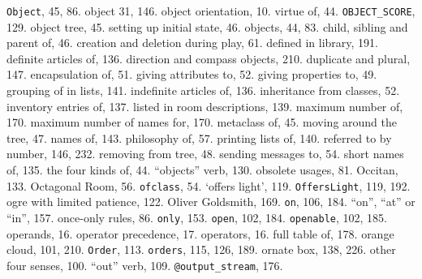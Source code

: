 {{\tt Object}}, 45, 86.
object 31, 146.
object orientation, 10.
\quad  virtue of, 44.
{{\tt OBJECT\_SCORE}}, 129.
object tree, 45.
\quad  setting up initial state, 46.
objects, 44, 83.
\quad  child, sibling and parent of, 46.
\quad  creation and deletion during play, 61.
\quad  defined in library, 191.
\quad  definite articles of, 136.
\quad  direction and compass objects, 210.
\quad  duplicate and plural, 147.
\quad  encapsulation of, 51.
\quad  giving attributes to, 52.
\quad  giving properties to, 49.
\quad  grouping of in lists, 141.
\quad  indefinite articles of, 136.
\quad  inheritance from classes, 52.
\quad  inventory entries of, 137.
\quad  listed in room descriptions, 139.
\quad  maximum number of, 170.
\quad  maximum number of names for, 170.
\quad  metaclass of, 45.
\quad  moving around the tree, 47.
\quad  names of, 143.
\quad  philosophy of, 57.
\quad  printing lists of, 140.
\quad  referred to by number, 146, 232.
\quad  removing from tree, 48.
\quad  sending messages to, 54.
\quad  short names of, 135.
\quad  the four kinds of, 44.
``objects'' verb, 130.
obsolete usages, 81.
Occitan, 133.
Octagonal Room, 56.
{{\tt ofclass}}, 54.
`offers light', 119.
{{\tt OffersLight}}, 119, 192.
ogre with limited patience, 122.
Oliver Goldsmith, 169.
{{\tt on}}, 106, 184.
``on'', ``at'' or ``in'', 157.
once-only rules, 86.
{{\tt only}}, 153.
{{\tt open}}, 102, 184.
{{\tt openable}}, 102, 185.
operands, 16.
operator precedence, 17.
operators, 16.
\quad  full table of, 178.
orange cloud, 101, 210.
{{\tt Order}}, 113.
{{\tt orders}}, 115, 126, 189.
ornate box, 138, 226.
other four senses, 100.
``out'' verb, 109.
{{\tt @output\_stream}}, 176.

